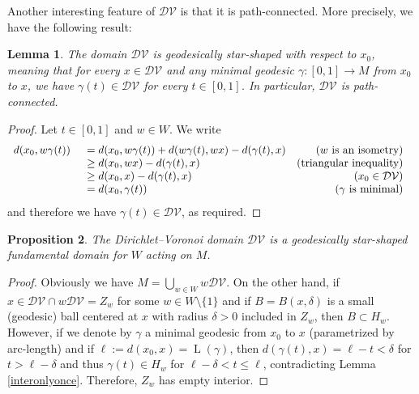 \documentclass[11pt,twoside]{amsart}
\theoremstyle{plain}
\newtheorem{prop}{Proposition}[section]
\newtheorem{lem}[prop]{Lemma}
\DeclareMathOperator\leng{L}
\begin{document}
Another interesting feature of $\mathcal{DV}$ is that it is path-connected. More precisely, we have the following result:

\begin{lem}\label{DVisstarshaped}
The domain $\mathcal{DV}$ is \emph{geodesically star-shaped} with respect to $x_0$, meaning that for every $x\in \mathcal{DV}$ and any minimal geodesic $\gamma : [0,1]\to M$ from $x_0$ to $x$, we have $\gamma(t)\in\mathcal{DV}$ for every $t\in[0,1]$. In particular, $\mathcal{DV}$ is path-connected.
\end{lem}

\begin{proof}
Let $t\in[0,1]$ and $w\in W$. We write
\[\begin{array}[t]{ll}
d(x_0,w\gamma(t)) &\begin{array}[t]{lr}
					=d(x_0,w\gamma(t))+d(w\gamma(t),wx)-d(\gamma(t),x) & \text{($w$ is an isometry)} \\
					\ge d(x_0,wx)-d(\gamma(t),x) & \text{(triangular inequality)}\\
					\ge d(x_0,x)-d(\gamma(t),x) & \text{($x_0\in\mathcal{DV}$)}\\
					=d(x_0,\gamma(t)) & \text{($\gamma$ is minimal)}\end{array}\\
\end{array}\]
and therefore we have $\gamma(t)\in\mathcal{DV}$, as required.
\end{proof}


\begin{prop}\label{funddomdiscreteisometrygroup}
The Dirichlet--Voronoi domain $\mathcal{DV}$ is a geodesically star-shaped fundamental domain for $W$ acting on $M$.
\end{prop}

\begin{proof}
Obviously we have $M=\bigcup_{w\in W}w\mathcal{DV}$. On the other hand, if $x\in \mathcal{DV}\cap w\mathcal{DV}=Z_w$ for some $w\in W\setminus\{1\}$ and if $B=B(x,\delta)$ is a small (geodesic) ball centered at $x$ with radius $\delta>0$ included in $Z_w$, then $B\subset H_w$. However, if we denote by $\gamma$ a minimal geodesic from $x_0$ to $x$ (parametrized by arc-length) and if $\ell:=d(x_0,x)=\leng(\gamma)$, then $d(\gamma(t),x)=\ell-t<\delta$ for $t>\ell-\delta$ and thus $\gamma(t)\in H_w$ for $\ell-\delta<t\le\ell$, contradicting Lemma \ref{interonlyonce}. Therefore, $Z_w$ has empty interior.
\end{proof}
\end{document}
